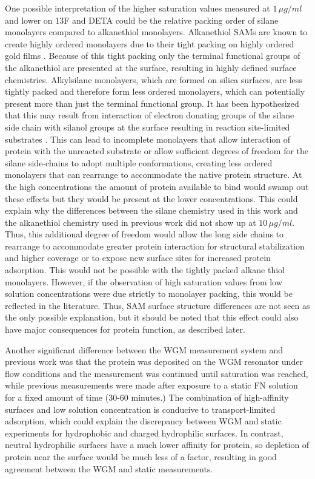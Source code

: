 One possible interpretation of the higher saturation values measured
at $1\,\mu g/ml$ and lower on 13F and DETA could be the relative
packing order of silane monolayers compared to alkanethiol monolayers.
Alkanethiol SAMs are known to create highly ordered monolayers due
to their tight packing on highly ordered gold films \cite{Prime1991}.
Because of this tight packing only the terminal functional groups
of the alkanethiol are presented at the surface, resulting in highly
defined surface chemistries. Alkylsilane monolayers, which are formed
on silica surfaces, are less tightly packed and therefore form less
ordered monolayers, which can potentially present more than just the
terminal functional group. It has been hypothesized that this may
result from interaction of electron donating groups of the silane
side chain with silanol groups at the surface resulting in reaction
site-limited substrates \cite{Stenger1992}. This can lead to incomplete
monolayers that allow interaction of protein with the unreacted substrate
or allow sufficient degrees of freedom for the silane side-chains
to adopt multiple conformations, creating less ordered monolayers
that can rearrange to accommodate the native protein structure. At
the high concentrations the amount of protein available to bind would
swamp out these effects but they would be present at the lower concentrations.
This could explain why the differences between the silane chemistry
used in this work and the alkanethiol chemistry used in previous work
\cite{Keselowsky2003} did not show up at $10\,\mu g/ml$. Thus, this
additional degree of freedom would allow the long side chains to rearrange
to accommodate greater protein interaction for structural stabilization
and higher coverage or to expose new surface sites for increased protein
adsorption. This would not be possible with the tightly packed alkane
thiol monolayers. However, if the observation of high saturation values
from low solution concentrations were due strictly to monolayer packing,
this would be reflected in the literature. Thus, SAM surface structure
differences are not seen as the only possible explanation, but it
should be noted that this effect could also have major consequences
for protein function, as described later. 

Another significant difference between the WGM measurement system
and previous work was that the protein was deposited on the WGM resonator
under flow conditions and the measurement was continued until saturation
was reached, while previous measurements were made after exposure
to a static FN solution for a fixed amount of time (30-60 minutes.)
The combination of high-affinity surfaces and low solution concentration
is conducive to transport-limited adsorption, which could explain
the discrepancy between WGM and static experiments for hydrophobic
and charged hydrophilic surfaces. In contrast, neutral hydrophilic
surfaces have a much lower affinity for protein, so depletion of protein
near the surface would be much less of a factor, resulting in good
agreement between the WGM and static measurements. 


